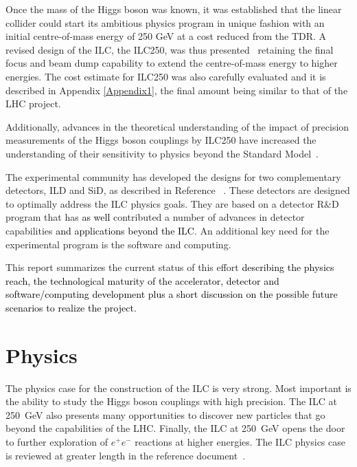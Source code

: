 \documentclass[%
 reprint,
 amsmath,amssymb,
 aps,
]{revtex4-1}
\newcommand{\juan}[1]{\textcolor{black}{{#1}}}
\def\ee{e^+e^-}
\begin{document}

Once the mass of the Higgs boson was known, it was established that the
linear collider could start its ambitious physics program in unique fashion with an initial centre-of-mass energy of 250 GeV at a cost reduced from the TDR. A revised design of the ILC, the ILC250, was thus  presented~\cite{Evans:2017rvt} retaining the final focus and beam dump capability to extend the centre-of-mass energy to higher energies.  The cost estimate for ILC250 was also carefully evaluated and it is described in Appendix \ref{Appendix1}, the final amount being similar to that of the LHC project.

Additionally, advances in the theoretical understanding of the impact of precision
measurements of the Higgs boson couplings by ILC250 have increased the understanding
of their sensitivity to physics beyond the Standard Model~\cite{Barklow:2017suo,Fujii:2017vwa}. 

The experimental community has developed the designs for two complementary detectors, ILD and SiD, as described in Reference ~\cite{Behnke:2013lya}. These detectors are designed to optimally address the
ILC physics goals.  They are based on a detector R\&D program that has \juan{as well}
contributed a number of advances in detector capabilities \juan{and applications beyond the ILC}.
An additional key need for the experimental program is the software and computing.

This report summarizes the current status of this effort \juan{describing the physics reach, the technological maturity of the accelerator, detector and software/computing development plus a short discussion on the possible future scenarios to realize the project.} 

\section{\label{sec:phys}Physics}

The physics case for the construction of the ILC is very strong.  
Most important is the ability to study the Higgs boson couplings
with high precision.  The ILC at 250~GeV also
presents many opportunities to discover new particles that go beyond
the capabilities of the LHC.  Finally, the ILC at 250~GeV opens the
door to further exploration of $\ee$ reactions at higher energies. 
The ILC physics case is reviewed at greater length in the reference
document~\cite{ILCforESS}. 
\end{document}
